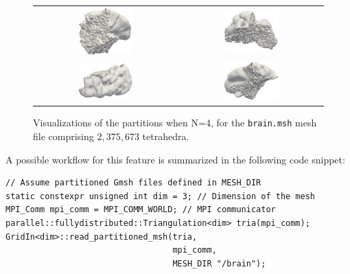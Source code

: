 \documentclass[a4paper,12pt]{article}
\begin{document}
\begin{figure}[htbp]
    \centering
    \begin{tabular}{cc}
        \includegraphics[width=0.4\textwidth]{brain_1_cropped.pdf} &
        \includegraphics[width=0.4\textwidth]{brain_2_cropped.pdf}   \\
        \includegraphics[width=0.4\textwidth]{brain_3_cropped.pdf} &
        \includegraphics[width=0.4\textwidth]{brain_4_cropped.pdf}   \\
    \end{tabular}
    \caption{Visualizations of the partitions when N=4, for the \texttt{brain.msh} mesh file comprising $2{,}375{,}673$ tetrahedra.}
    \label{fig:partitioned_meshes}
\end{figure}

A possible workflow for this feature is summarized in the following code snippet:
\begin{lstlisting}[caption=Creating a \texttt{p::f::T} object from partitioned Gmsh files, label={lst:gmsh_workflow}]
// Assume partitioned Gmsh files defined in MESH_DIR
static constexpr unsigned int dim = 3; // Dimension of the mesh
MPI_Comm mpi_comm = MPI_COMM_WORLD; // MPI communicator
parallel::fullydistributed::Triangulation<dim> tria(mpi_comm);
GridIn<dim>::read_partitioned_msh(tria,
                                  mpi_comm,
                                  MESH_DIR "/brain");
\end{lstlisting}
\end{document}
